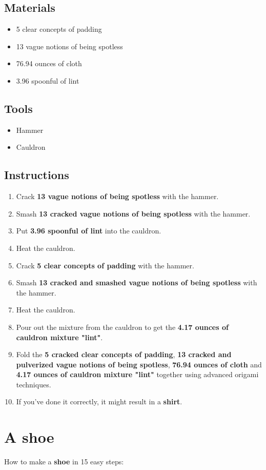 \documentclass{article}
\begin{document}
\subsection{Materials}\begin{itemize}
\item 
5 clear concepts of padding
\item 
13 vague notions of being spotless
\item 
76.94 ounces of cloth
\item 
3.96 spoonful of lint
\end{itemize}
\subsection{Tools}\begin{itemize}
\item 
Hammer
\item 
Cauldron
\end{itemize}
\subsection{Instructions}\begin{enumerate}
\item 
Crack \textbf{13 vague notions of being spotless} with the hammer.
\item 
Smash \textbf{13 cracked vague notions of being spotless} with the hammer.
\item 
Put \textbf{3.96 spoonful of lint} into the cauldron.
\item 
Heat the cauldron.
\item 
Crack \textbf{5 clear concepts of padding} with the hammer.
\item 
Smash \textbf{13 cracked and smashed vague notions of being spotless} with the hammer.
\item 
Heat the cauldron.
\item 
Pour out the mixture from the cauldron to get the \textbf{4.17 ounces of cauldron mixture "lint"}.
\item 
Fold the \textbf{5 cracked clear concepts of padding}, \textbf{13 cracked and pulverized vague notions of being spotless}, \textbf{76.94 ounces of cloth} and \textbf{4.17 ounces of cauldron mixture "lint"} together using advanced origami techniques.
\item 
If you've done it correctly, it might result in a \textbf{shirt}.
\end{enumerate}
\newpage
\section{A shoe}How to make a \textbf{shoe} in 15 easy steps:
\end{document}
